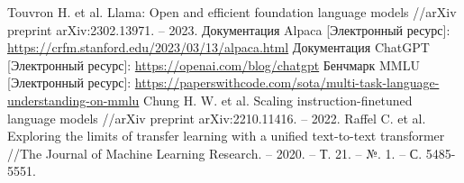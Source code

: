 \begin{thebibliography}{99}
  Touvron H. et al. Llama: Open and efficient foundation language models //arXiv preprint arXiv:2302.13971. – 2023.
  Документация Alpaca [Электронный ресурс]: \url{https://crfm.stanford.edu/2023/03/13/alpaca.html}
  Документация ChatGPT [Электронный ресурс]: \url{https://openai.com/blog/chatgpt}
  Бенчмарк MMLU [Электронный ресурс]: \url{https://paperswithcode.com/sota/multi-task-language-understanding-on-mmlu}
  Chung H. W. et al. Scaling instruction-finetuned language models //arXiv preprint arXiv:2210.11416. – 2022.
  Raffel C. et al. Exploring the limits of transfer learning with a unified text-to-text transformer //The Journal of Machine Learning Research. – 2020. – Т. 21. – №. 1. – С. 5485-5551.
\end{thebibliography}